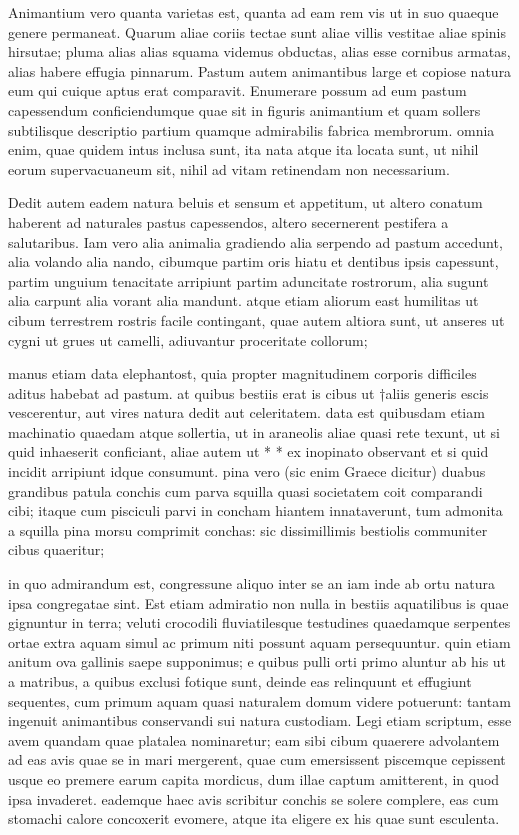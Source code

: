  Animantium vero quanta varietas est, quanta ad eam rem vis ut in suo quaeque genere permaneat. Quarum aliae coriis tectae sunt aliae villis vestitae aliae spinis hirsutae; pluma alias alias squama videmus obductas, alias esse cornibus armatas, alias habere effugia pinnarum. Pastum autem animantibus large et copiose natura eum qui cuique aptus erat comparavit. Enumerare possum ad eum pastum capessendum conficiendumque quae sit in figuris animantium et quam sollers subtilisque descriptio partium quamque admirabilis fabrica membrorum. omnia enim, quae quidem intus inclusa sunt, ita nata atque ita locata sunt, ut nihil eorum supervacuaneum sit, nihil ad vitam retinendam non necessarium.

 Dedit autem eadem natura beluis et sensum et appetitum, ut altero conatum haberent ad naturales pastus capessendos, altero secernerent pestifera a salutaribus. Iam vero alia animalia gradiendo alia serpendo ad pastum accedunt, alia volando alia nando, cibumque partim oris hiatu et dentibus ipsis capessunt, partim unguium tenacitate arripiunt partim aduncitate rostrorum, alia sugunt alia carpunt alia vorant alia mandunt. atque etiam aliorum east humilitas ut cibum terrestrem rostris facile contingant, quae autem altiora sunt, ut anseres ut cygni ut grues ut camelli, adiuvantur proceritate collorum;

 manus etiam data elephantost, quia propter magnitudinem corporis difficiles aditus habebat ad pastum. at quibus bestiis erat is cibus ut †aliis generis escis vescerentur, aut vires natura dedit aut celeritatem. data est quibusdam etiam machinatio quaedam atque sollertia, ut in araneolis aliae quasi rete texunt, ut si quid inhaeserit conficiant, aliae autem ut * * ex inopinato observant et si quid incidit arripiunt idque consumunt. pina vero (sic enim Graece dicitur) duabus grandibus patula conchis cum parva squilla quasi societatem coit comparandi cibi; itaque cum pisciculi parvi in concham hiantem innataverunt, tum admonita a squilla pina morsu comprimit conchas: sic dissimillimis bestiolis communiter cibus quaeritur;

 in quo admirandum est, congressune aliquo inter se an iam inde ab ortu natura ipsa congregatae sint. Est etiam admiratio non nulla in bestiis aquatilibus is quae gignuntur in terra; veluti crocodili fluviatilesque testudines quaedamque serpentes ortae extra aquam simul ac primum niti possunt aquam persequuntur. quin etiam anitum ova gallinis saepe supponimus; e quibus pulli orti primo aluntur ab his ut a matribus, a quibus exclusi fotique sunt, deinde eas relinquunt et effugiunt sequentes, cum primum aquam quasi naturalem domum videre potuerunt: tantam ingenuit animantibus conservandi sui natura custodiam. Legi etiam scriptum, esse avem quandam quae platalea nominaretur; eam sibi cibum quaerere advolantem ad eas avis quae se in mari mergerent, quae cum emersissent piscemque cepissent usque eo premere earum capita mordicus, dum illae captum amitterent, in quod ipsa invaderet. eademque haec avis scribitur conchis se solere complere, eas cum stomachi calore concoxerit evomere, atque ita eligere ex his quae sunt esculenta.

